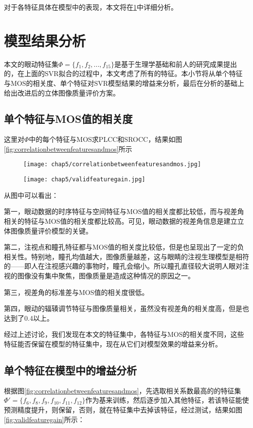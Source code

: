 对于各特征具体在模型中的表现，本文将在\ref{sec:analysisresult}中详细分析。
\section{模型结果分析}
\label{sec:analysisresult}
本文的眼动特征集$\Phi=\{f_1,f_2,...,f_{15}\}$是基于生理学基础和前人的研究成果提出的，在上面的SVR拟合的过程中，本文考虑了所有的特征。本小节将从单个特征与MOS的相关度、单个特征对SVR模型结果的增益来分析，最后在分析的基础上给出改进后的立体图像质量评价方案。
\subsection{单个特征与MOS值的相关度}
\label{corbetweenfeatureandmos}
这里对$\Phi$中的每个特征与MOS求PLCC和SROCC，结果如图\ref{fig:correlationbetweenfeaturesandmos}所示
\begin{figure}[!htp]
  \centering
  \texttt{[image: chap5/correlationbetweenfeaturesandmos.jpg]}
\end{figure}
\begin{figure}[!htp]
  \centering
  \texttt{[image: chap5/validfeaturegain.jpg]}
\end{figure}
从图中可以看出：

第一，眼动数据的时序特征与空间特征与MOS值的相关度都比较低，而与视差角相关的特征与MOS值的相关度都比较高。可见，眼动数据的视差角信息是建立立体图像质量评价模型的关键。

第二，注视点和瞳孔特征都与MOS值的相关度比较低，但是也呈现出了一定的负相关性。特别地，瞳孔均值越大，图像质量越差，这与眼睛的注视生理模型是相符的------即人在注视感兴趣的事物时，瞳孔会缩小。所以瞳孔直径较大说明人眼对注视的图像没有集中聚焦，图像质量是造成这种情况的原因之一。

第三，视差角的标准差与MOS值的相关度很低。

第四，眼动的辐辏调节特征与图像质量相关，虽然没有视差角的相关度高，但是也达到了0.4以上。

经过上述讨论，我们发现在本文的特征集中，各特征与MOS的相关度不同，这些特征能否保留在模型的特征集中，现在从它们对模型效果的增益来分析。
\subsection{单个特征在模型中的增益分析}
\label{thegainoffeatures}
根据图\ref{fig:correlationbetweenfeaturesandmos}，先选取相关系数最高的的特征集$\Phi '=\{f_6,f_8,f_9,f_{10},f_{11},f_{12}\}$作为基来训练，然后逐步加入其他特征，若该特征能使预测精度提升，则保留，否则，就在特征集中去掉该特征，经过测试，结果如图\ref{fig:validfeaturegain}所示：

